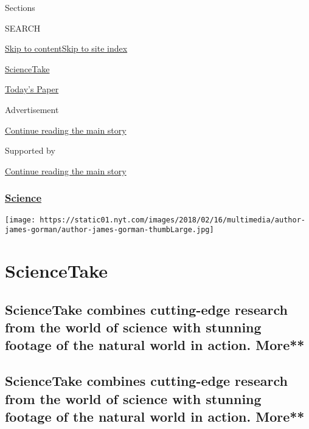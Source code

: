 Sections

SEARCH

\protect\hyperlink{site-content}{Skip to
content}\protect\hyperlink{site-index}{Skip to site index}

\href{https://www.nytimes.com/column/sciencetake}{ScienceTake}

\href{https://myaccount.nytimes.com/auth/login?response_type=cookie\&client_id=vi}{}

\href{https://www.nytimes.com/section/todayspaper}{Today's Paper}

Advertisement

\protect\hyperlink{after-top}{Continue reading the main story}

Supported by

\protect\hyperlink{after-sponsor}{Continue reading the main story}

\hypertarget{science}{%
\subsubsection{\texorpdfstring{\href{/section/science}{Science}}{Science}}\label{science}}

\texttt{[image: https://static01.nyt.com/images/2018/02/16/multimedia/author-james-gorman/author-james-gorman-thumbLarge.jpg]}

\hypertarget{sciencetake}{%
\section{ScienceTake}\label{sciencetake}}

\hypertarget{sciencetake-combines-cutting-edge-research-from-the-world-of-science-with-stunning-footage-of-the-natural-world-in-action-more}{%
\subsection{ScienceTake combines cutting-edge research from the world of
science with stunning footage of the natural world in action.
More**}\label{sciencetake-combines-cutting-edge-research-from-the-world-of-science-with-stunning-footage-of-the-natural-world-in-action-more}}

\hypertarget{sciencetake-combines-cutting-edge-research-from-the-world-of-science-with-stunning-footage-of-the-natural-world-in-action-more-1}{%
\subsection{ScienceTake combines cutting-edge research from the world of
science with stunning footage of the natural world in action.
More**}\label{sciencetake-combines-cutting-edge-research-from-the-world-of-science-with-stunning-footage-of-the-natural-world-in-action-more-1}}

